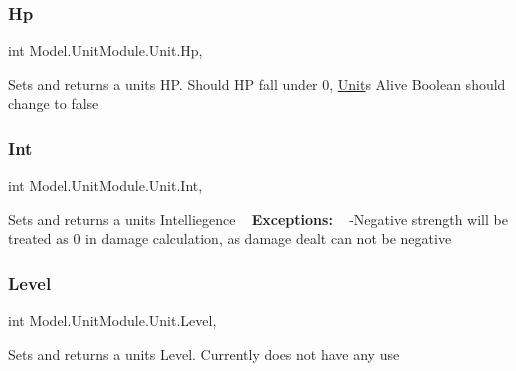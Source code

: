 \subsubsection{\texorpdfstring{Hp}{Hp}}
{\footnotesize\ttfamily int Model.\+Unit\+Module.\+Unit.\+Hp\hspace{0.3cm}{\ttfamily [get]}, {\ttfamily [set]}}

Sets and returns a unit\textquotesingle{}s HP. Should HP fall under 0, \hyperlink{interface_model_1_1_unit_module_1_1_unit}{Unit}\textquotesingle{}s Alive Boolean should change to false \hypertarget{interface_model_1_1_unit_module_1_1_unit_a5d4c43aadb3c632713839ff4a9181c3b}{}\label{interface_model_1_1_unit_module_1_1_unit_a5d4c43aadb3c632713839ff4a9181c3b} 
\subsubsection{\texorpdfstring{Int}{Int}}
{\footnotesize\ttfamily int Model.\+Unit\+Module.\+Unit.\+Int\hspace{0.3cm}{\ttfamily [get]}, {\ttfamily [set]}}

Sets and returns a unit\textquotesingle{}s Intelliegence ~\newline
 {\bfseries Exceptions\+:} ~\newline
 -\/\+Negative strength will be treated as 0 in damage calculation, as damage dealt can not be negative \hypertarget{interface_model_1_1_unit_module_1_1_unit_a0f39c9d9a4c24b80025483e82611d69c}{}\label{interface_model_1_1_unit_module_1_1_unit_a0f39c9d9a4c24b80025483e82611d69c} 
\subsubsection{\texorpdfstring{Level}{Level}}
{\footnotesize\ttfamily int Model.\+Unit\+Module.\+Unit.\+Level\hspace{0.3cm}{\ttfamily [get]}, {\ttfamily [set]}}

Sets and returns a unit\textquotesingle{}s Level. Currently does not have any use \hypertarget{interface_model_1_1_unit_module_1_1_unit_a6e4318baed5214203b0af5edd7e0deab}{}\label{interface_model_1_1_unit_module_1_1_unit_a6e4318baed5214203b0af5edd7e0deab} 
